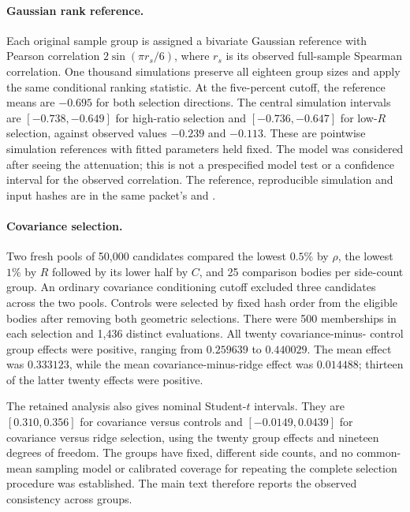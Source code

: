 \paragraph{Gaussian rank reference.}
Each original sample group is assigned a bivariate Gaussian reference
with Pearson correlation $2\sin(\pi r_s/6)$, where $r_s$ is its observed
full-sample Spearman correlation. One thousand simulations preserve all
eighteen group sizes and apply the same conditional ranking statistic.
At the five-percent cutoff, the reference means are $-0.695$ for both
selection directions. The central simulation intervals are
$[-0.738,-0.649]$ for high-ratio selection and $[-0.736,-0.647]$ for
low-$R$ selection, against observed values $-0.239$ and $-0.113$.
These are pointwise simulation references with fitted parameters held
fixed. The model was considered after seeing the attenuation; this is
not a prespecified model test or a confidence interval for the observed
correlation. The reference, reproducible simulation and input hashes are
in the same packet's  and
.

\paragraph{Covariance selection.}
Two fresh pools of 50,000 candidates compared the lowest $0.5\%$ by
$\rho$, the lowest $1\%$ by $R$ followed by its lower half by $C$, and
25 comparison bodies per side-count group. An ordinary covariance
conditioning cutoff excluded three candidates across the two pools.
Controls were selected by fixed hash order from the eligible bodies after
removing both geometric selections. There were 500 memberships in each
selection and 1,436 distinct evaluations. All twenty covariance-minus-
control group effects were positive, ranging from $0.259639$ to $0.440029$.
The mean effect was $0.333123$, while the mean covariance-minus-ridge
effect was $0.014488$; thirteen of the latter twenty effects were positive.

The retained analysis also gives nominal Student-$t$ intervals. They are
$[0.310,0.356]$ for covariance versus controls and $[-0.0149,0.0439]$
for covariance versus ridge selection, using the twenty group effects
and nineteen degrees of freedom. The groups have fixed, different side
counts, and no common-mean sampling model or calibrated coverage for
repeating the complete selection procedure was established. The main text
therefore reports the observed consistency across groups.

